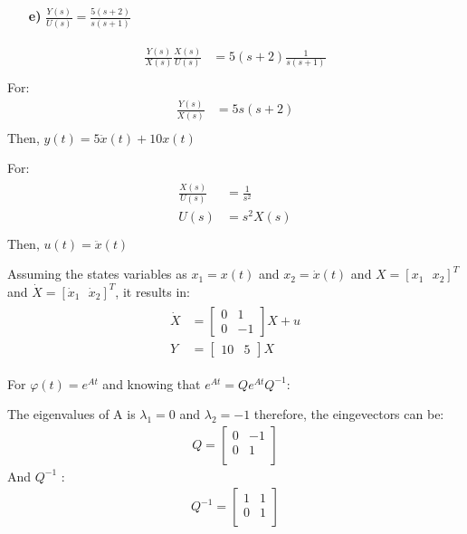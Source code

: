 \documentclass{article}
\begin{document}
\begin{enumerate}[]
\item[\textbf{e)}] $ \frac{Y(s)}{U(s)} = \frac{5(s+2)}{s(s+1)} $
\end{enumerate}
\begin{eqnarray*}
\begin{split}
	\frac{Y(s)}{X(s)}\frac{X(s)}{U(s)} &= 5(s+2)\frac{1}{s(s+1)} \\
\end{split}
\end{eqnarray*}
For:
\begin{eqnarray*}
	\frac{Y(s)}{X(s)} &= 5s(s+2)\\
\end{eqnarray*}
Then, $ y(t) = 5\ddot{x}(t)+10x(t) $

For:
\begin{eqnarray*}
	\begin{split}
	\frac{X(s)}{U(s)} &= \frac{1}{s^2}\\
	U(s) &= s^2X(s) \\
	\end{split}
\end{eqnarray*}
Then, $ u(t) = \ddot{x}(t)$

Assuming the states variables as $x_1 = x(t)$ and $x_2 = \dot{x}(t)$ and $X = [x_1\:\:\:x_2]^T$ and $\dot{X} = [\dot{x}_1\:\:\:\dot{x}_2]^T$, it results in:
\begin{eqnarray*}
\begin{split}
\dot{X} &= 
\begin{bmatrix}
0 & 1 \\
0 & -1
\end{bmatrix} X + u \\ Y &= 
\begin{bmatrix}
10 & 5
\end{bmatrix} X
\end{split}
\end{eqnarray*}

For $\varphi(t) = e^{At} $ and knowing that $e^{At} =Qe^{At}Q^{-1}$: 

The eigenvalues of A is $\lambda_1 = 0 $ and $\lambda_2 = -1 $  therefore, the eingevectors can be:
\begin{eqnarray*}
Q = 
\begin{bmatrix}
0 & -1 \\
0 & 1 \\
\end{bmatrix}
\end{eqnarray*}
And $ Q^{-1} $ :
\begin{eqnarray*}
Q^{-1} = 
\begin{bmatrix}
1 & 1 \\
0 & 1 \\
\end{bmatrix}
\end{eqnarray*}
\end{document}

